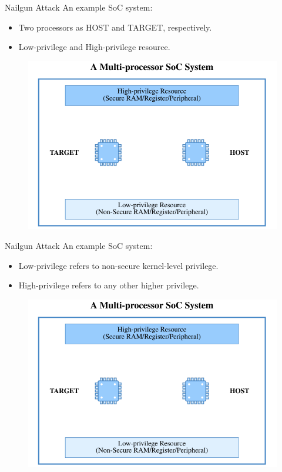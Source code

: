 \documentclass{beamer}
\begin{document}
\begin{frame}{Nailgun Attack}
    An example SoC system:
    \begin{itemize}
        \item Two processors as HOST and TARGET, respectively.
        \item Low-privilege and High-privilege resource.
    \end{itemize}
    \begin{figure}
        \centering
        \includegraphics[scale=.40]{SUSTech-Beamer-Theme/pic/Nailgun2.png}
        \label{fig:my_label}
    \end{figure}
\end{frame}

\begin{frame}{Nailgun Attack}
    An example SoC system:
    \begin{itemize}
        \item Low-privilege refers to non-secure kernel-level privilege.
        \item High-privilege refers to any other higher privilege.
    \end{itemize}
    \begin{figure}
        \centering
        \includegraphics[scale=.40]{SUSTech-Beamer-Theme/pic/Nailgun2.png}
        \label{fig:my_label}
    \end{figure}
\end{frame}
\end{document}
